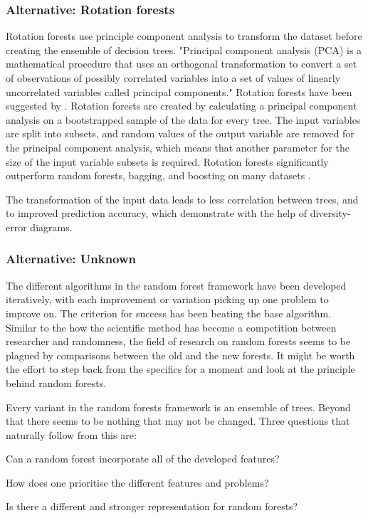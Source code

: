 \documentclass[a4paper,man,12pt,apacite,floatsintext,draftfirst]{apa6} %
\begin{document}
\subsubsection{Alternative: Rotation forests}
Rotation forests use principle component analysis to transform
the dataset before creating the ensemble of decision trees.
"Principal component analysis (PCA) is a mathematical procedure that uses
an orthogonal transformation to convert a set of observations of possibly
correlated variables into a set of values of linearly uncorrelated variables
called principal components." \cite{wpPCA}
Rotation forests have been suggested by \cite{rodriguez2006rotation}.
Rotation forests are created by calculating a principal component analysis
on a bootstrapped sample of the data for every tree.
The input variables are split into subsets, and random values of the output
variable are removed for the principal component analysis, which means that
another parameter for the size of the input variable subsets is required.
Rotation forests significantly outperform random forests, bagging, and
boosting on many datasets \cite{rodriguez2006rotation}.

The transformation of the input data leads to less correlation between trees,
and to improved prediction accuracy, which \cite{rodriguez2006rotation}
demonstrate with the help of diversity-error diagrams.

\subsubsection{Alternative: Unknown}
The different algorithms in the random forest framework have been developed
iteratively, with each improvement or variation picking up one problem to
improve on.
The criterion for success has been beating the base algorithm.
Similar to the how the scientific method has become a competition between
researcher and randomness, the field of research on random forests seems
to be plagued by comparisons between the old and the new forests.
It might be worth the effort to step back from the specifics for a moment
and look at the principle behind random forests.

Every variant in the random forests framework is an ensemble of trees.
Beyond that there seems to be nothing that may not be changed.
Three questions that naturally follow from this are:

\begin{APAenumerate}
\item Can a random forest incorporate all of the developed features?
\item How does one prioritise the different features and problems?
\item Is there a different and stronger representation for random forests?
\end{APAenumerate}
\end{document}
